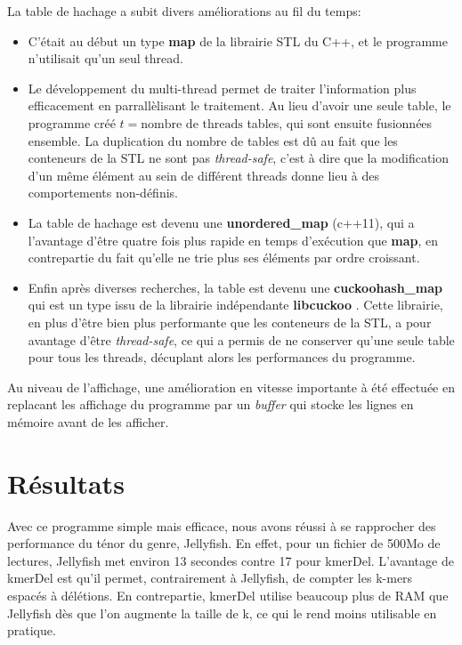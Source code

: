\documentclass{report}
\begin{document}
      La table de hachage a subit divers améliorations au fil du temps:\\
      \begin{itemize}
        \item C'était au début un type \textbf{map} de la librairie STL du C++, et le programme n'utilisait qu'un seul thread.
        \item Le développement du multi-thread permet de traiter l'information plus efficacement en parrallèlisant le traitement. Au lieu d'avoir une seule table, le programme créé $t = \text{nombre de threads}$ tables, qui sont ensuite fusionnées ensemble. La duplication du nombre de tables est dû au fait que les conteneurs de la STL ne sont pas \textit{thread-safe}, c'est à dire que la modification d'un même élément au sein de différent threads donne lieu à des comportements non-définis.
        \item La table de hachage est devenu une \textbf{unordered\_map} (c++11), qui a l'avantage d'être quatre fois plus rapide en temps d'exécution que \textbf{map}, en contrepartie du fait qu'elle ne trie plus ses éléments par ordre croissant.
        \item Enfin après diverses recherches, la table est devenu une \textbf{cuckoohash\_map} qui est un type issu de la librairie indépendante \textbf{libcuckoo} \cite{Cuckoo2013} \cite{Cuckoo2014}. Cette librairie, en plus d'être bien plus performante que les conteneurs de la STL, a pour avantage d'être \textit{thread-safe}, ce qui a permis de ne conserver qu'une seule table pour tous les threads, décuplant alors les performances du programme.
      \end{itemize}\bigskip
      Au niveau de l'affichage, une amélioration en vitesse importante à été effectuée en replacant les affichage du programme par un \textit{buffer} qui stocke les lignes en mémoire avant de les afficher.
    \section{Résultats}
      Avec ce programme simple mais efficace, nous avons réussi à se rapprocher des performance du ténor du genre, Jellyfish. En effet, pour un fichier de 500Mo de lectures, Jellyfish met environ 13 secondes contre 17 pour kmerDel. L'avantage de kmerDel est qu'il permet, contrairement à Jellyfish, de compter les k-mers espacés à délétions. En contrepartie, kmerDel utilise beaucoup plus de RAM que Jellyfish dès que l'on augmente la taille de k, ce qui le rend moins utilisable en pratique.\\
\end{document}
